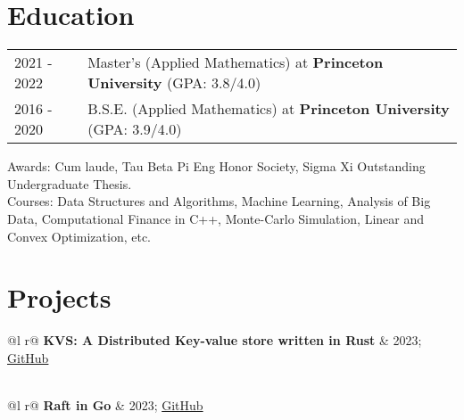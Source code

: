 \documentclass[a4paper,12pt]{article}
\begin{document}
\section{Education}

\begin{tabularx}{\linewidth}{@{}l X@{}}	
2021 - 2022 & Master's (Applied Mathematics) at \textbf{Princeton University} \hfill \normalsize (GPA: 3.8/4.0) \\

2016 - 2020 & B.S.E. (Applied Mathematics) at \textbf{Princeton University} \hfill (GPA: 3.9/4.0) \\ 

\end{tabularx}

Awards: Cum laude, Tau Beta Pi Eng Honor Society, Sigma Xi Outstanding Undergraduate Thesis. \\
Courses: Data Structures and Algorithms, Machine Learning, Analysis of Big Data, Computational Finance in C++, Monte-Carlo Simulation, Linear and Convex Optimization, etc.


\section{Projects}
\begin{tabularx}{\linewidth}{ @{}l r@{} }
\textbf{KVS: A Distributed Key-value store written in Rust} & \hfill 2023; \href{https://github.com/cjeva10/kvs}{GitHub} \\[3.75pt]
  \\
\end{tabularx}

\begin{tabularx}{\linewidth}{ @{}l r@{} }
\textbf{Raft in Go} & \hfill 2023; \href{https://github.com/cjeva10/raft}{GitHub} \\[3.75pt]
  \\
\end{tabularx}
\end{document}
